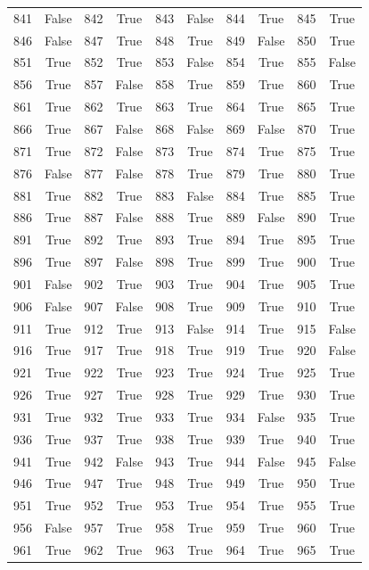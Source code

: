 \begin{longtable}{cc|cc|cc|cc|cc}
841 & False & 842 & True & 843 & False & 844 & True & 845 & True \\
846 & False & 847 & True & 848 & True & 849 & False & 850 & True \\
851 & True & 852 & True & 853 & False & 854 & True & 855 & False \\
856 & True & 857 & False & 858 & True & 859 & True & 860 & True \\
861 & True & 862 & True & 863 & True & 864 & True & 865 & True \\
866 & True & 867 & False & 868 & False & 869 & False & 870 & True \\
871 & True & 872 & False & 873 & True & 874 & True & 875 & True \\
876 & False & 877 & False & 878 & True & 879 & True & 880 & True \\
881 & True & 882 & True & 883 & False & 884 & True & 885 & True \\
886 & True & 887 & False & 888 & True & 889 & False & 890 & True \\
891 & True & 892 & True & 893 & True & 894 & True & 895 & True \\
896 & True & 897 & False & 898 & True & 899 & True & 900 & True \\
901 & False & 902 & True & 903 & True & 904 & True & 905 & True \\
906 & False & 907 & False & 908 & True & 909 & True & 910 & True \\
911 & True & 912 & True & 913 & False & 914 & True & 915 & False \\
916 & True & 917 & True & 918 & True & 919 & True & 920 & False \\
921 & True & 922 & True & 923 & True & 924 & True & 925 & True \\
926 & True & 927 & True & 928 & True & 929 & True & 930 & True \\
931 & True & 932 & True & 933 & True & 934 & False & 935 & True \\
936 & True & 937 & True & 938 & True & 939 & True & 940 & True \\
941 & True & 942 & False & 943 & True & 944 & False & 945 & False \\
946 & True & 947 & True & 948 & True & 949 & True & 950 & True \\
951 & True & 952 & True & 953 & True & 954 & True & 955 & True \\
956 & False & 957 & True & 958 & True & 959 & True & 960 & True \\
961 & True & 962 & True & 963 & True & 964 & True & 965 & True \\

\end{longtable}
